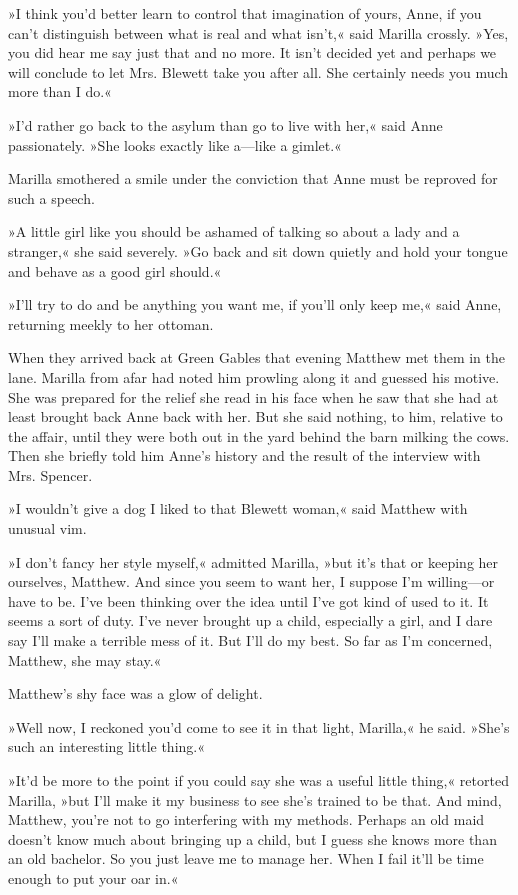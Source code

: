 »I think you’d better learn to control that imagination of yours, Anne, if you can’t distinguish between what is real and what isn’t,« said Marilla crossly. »Yes, you did hear me say just that and no more. It isn’t decided yet and perhaps we will conclude to let Mrs. Blewett take you after all. She certainly needs you much more than I do.«

»I’d rather go back to the asylum than go to live with her,« said Anne passionately. »She looks exactly like a—like a gimlet.«

Marilla smothered a smile under the conviction that Anne must be reproved for such a speech.

»A little girl like you should be ashamed of talking so about a lady and a stranger,« she said severely. »Go back and sit down quietly and hold your tongue and behave as a good girl should.«

»I’ll try to do and be anything you want me, if you’ll only keep me,« said Anne, returning meekly to her ottoman.

When they arrived back at Green Gables that evening Matthew met them in the lane. Marilla from afar had noted him prowling along it and guessed his motive. She was prepared for the relief she read in his face when he saw that she had at least brought back Anne back with her. But she said nothing, to him, relative to the affair, until they were both out in the yard behind the barn milking the cows. Then she briefly told him Anne’s history and the result of the interview with Mrs. Spencer.

»I wouldn’t give a dog I liked to that Blewett woman,« said Matthew with unusual vim.

»I don’t fancy her style myself,« admitted Marilla, »but it’s that or keeping her ourselves, Matthew. And since you seem to want her, I suppose I’m willing—or have to be. I’ve been thinking over the idea until I’ve got kind of used to it. It seems a sort of duty. I’ve never brought up a child, especially a girl, and I dare say I’ll make a terrible mess of it. But I’ll do my best. So far as I’m concerned, Matthew, she may stay.«

Matthew’s shy face was a glow of delight.

»Well now, I reckoned you’d come to see it in that light, Marilla,« he said. »She’s such an interesting little thing.«

»It’d be more to the point if you could say she was a useful little thing,« retorted Marilla, »but I’ll make it my business to see she’s trained to be that. And mind, Matthew, you’re not to go interfering with my methods. Perhaps an old maid doesn’t know much about bringing up a child, but I guess she knows more than an old bachelor. So you just leave me to manage her. When I fail it’ll be time enough to put your oar in.«

